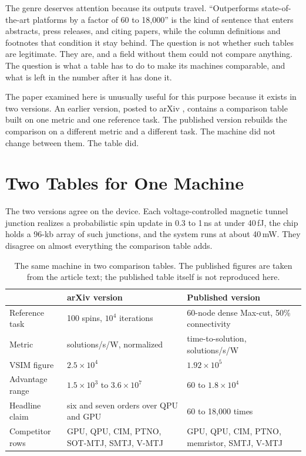\documentclass[11pt]{article}
\theoremstyle{definition}
\theoremstyle{remark}
\begin{document}
The genre deserves attention because its outputs travel. ``Outperforms state-of-the-art platforms by a factor of 60 to 18,000'' is the kind of sentence that enters abstracts, press releases, and citing papers, while the column definitions and footnotes that condition it stay behind. The question is not whether such tables are legitimate. They are, and a field without them could not compare anything. The question is what a table has to do to make its machines comparable, and what is left in the number after it has done it.

The paper examined here \cite{li2026} is unusually useful for this purpose because it exists in two versions. An earlier version, posted to arXiv \cite{li2025arxiv}, contains a comparison table built on one metric and one reference task. The published version rebuilds the comparison on a different metric and a different task. The machine did not change between them. The table did.

\section{Two Tables for One Machine}

The two versions agree on the device. Each voltage-controlled magnetic tunnel junction realizes a probabilistic spin update in 0.3 to 1\,ns at under 40\,fJ, the chip holds a 96-kb array of such junctions, and the system runs at about 40\,mW. They disagree on almost everything the comparison table adds.

\begin{table}[h]
\centering
\footnotesize
\begin{tabular}{p{}p{}p{}}
\toprule
 & arXiv version \cite{li2025arxiv} & Published version \cite{li2026} \\
\midrule
Reference task & 100 spins, $10^4$ iterations & 60-node dense Max-cut, 50\% connectivity \\
Metric & solutions/s/W, normalized & time-to-solution, solutions/s/W \\
VSIM figure & $2.5 \times 10^4$ & $1.92 \times 10^5$ \\
Advantage range & $1.5 \times 10^3$ to $3.6 \times 10^7$ & 60 to $1.8 \times 10^4$ \\
Headline claim & six and seven orders over QPU and GPU & 60 to 18,000 times \\
Competitor rows & GPU, QPU, CIM, PTNO, SOT-MTJ, SMTJ, V-MTJ & GPU, QPU, CIM, PTNO, memristor, SMTJ, V-MTJ \\
\bottomrule
\end{tabular}
\caption{The same machine in two comparison tables. The published figures are taken from the article text; the published table itself is not reproduced here.}
\label{tab:versions}
\end{table}
\end{document}
